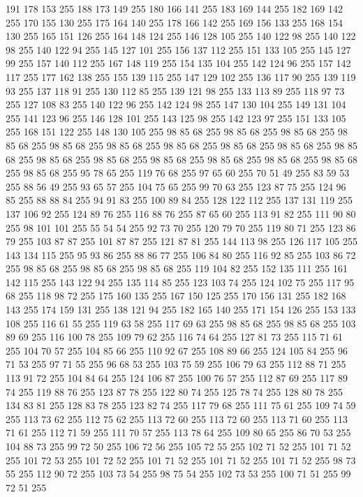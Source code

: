 191 178 153 255 188 173 149 255 180 166 141 255 183 169 144 255 182 169 142 255 170 155 130 255 175 164 140 255 178 166 142 255 169 156 133 255 168 154 130 255 165 151 126 255 164 148 124 255 146 128 105 255 140 122 98 255 140 122 98 255 140 122 94 255 145 127 101 255 156 137 112 255 151 133 105 255 145 127 99 255 157 140 112 255 167 148 119 255 154 135 104 255 142 124 96 255 157 142 117 255 177 162 138 255 155 139 115 255 147 129 102 255 136 117 90 255 139 119 93 255 137 118 91 255 130 112 85 255 139 121 98 255 133 113 89 255 118 97 73 255 127 108 83 255 140 122 96 255 142 124 98 255 147 130 104 255 149 131 104 255 141 123 96 255 146 128 101 255 143 125 98 255 142 123 97 255 151 133 105 255 168 151 122 255 148 130 105 255 98 85 68 255 98 85 68 255 98 85 68 255 98 85 68 255 98 85 68 255 98 85 68 255 98 85 68 255 98 85 68 255 98 85 68 255 98 85 68 255 98 85 68 255 98 85 68 255 98 85 68 255 98 85 68 255 98 85 68 255 98 85 68 255 98 85 68 255
95 78 65 255 119 76 68 255 97 65 60 255 70 51 49 255 83 59 53 255 88 56 49 255 93 65 57 255 104 75 65 255 99 70 63 255 123 87 75 255 124 96 85 255 88 88 84 255 94 91 83 255 100 89 84 255 128 122 112 255 137 131 119 255 137 106 92 255 124 89 76 255 116 88 76 255 87 65 60 255 113 91 82 255 111 90 80 255 98 101 101 255 55 54 54 255 92 73 70 255 120 79 70 255 119 80 71 255 123 86 79 255 103 87 87 255 101 87 87 255 121 87 81 255 144 113 98 255 126 117 105 255 143 134 115 255 95 93 86 255 88 86 77 255 106 84 80 255 116 92 85 255 103 86 72 255 98 85 68 255 98 85 68 255 98 85 68 255 119 104 82 255 152 135 111 255 161 142 115 255 143 122 94 255 135 114 85 255 123 103 74 255 124 102 75 255 117 95 68 255 118 98 72 255 175 160 135 255 167 150 125 255 170 156 131 255 182 168 143 255 174 159 131 255 138 121 94 255 182 165 140 255 171 154 126 255 153 133 108 255 116 61 55 255 119 63 58 255 117 69 63 255 98 85 68 255
98 85 68 255 103 89 69 255 116 100 78 255 109 79 62 255 116 74 64 255 127 81 73 255 115 71 61 255 104 70 57 255 104 85 66 255 110 92 67 255 108 89 66 255 124 105 84 255 96 71 53 255 97 71 55 255 96 68 53 255 103 75 59 255 106 79 63 255 112 88 71 255 113 91 72 255 104 84 64 255 124 106 87 255 100 76 57 255 112 87 69 255 117 89 74 255 119 88 76 255 123 87 78 255 122 80 74 255 125 78 74 255 128 80 78 255 134 83 81 255 128 83 78 255 123 82 74 255 117 79 68 255 111 75 61 255 109 74 59 255 113 73 62 255 112 75 62 255 113 72 60 255 113 72 60 255 113 71 60 255 113 71 61 255 112 71 59 255 111 70 57 255 113 78 64 255 109 80 65 255 86 70 53 255 104 88 73 255 99 72 50 255 106 72 56 255 105 72 55 255 102 71 52 255 101 71 52 255 101 72 53 255 101 72 52 255 101 71 52 255 101 71 52 255 101 71 52 255 98 73 55 255 112 90 72 255 103 73 54 255 98 75 54 255 102 73 53 255 100 71 51 255 99 72 51 255
